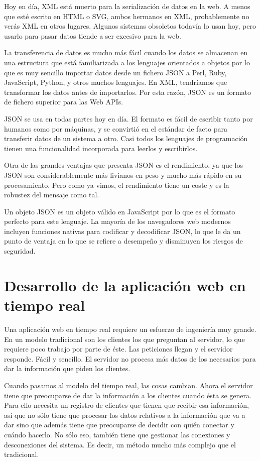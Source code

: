 Hoy en día, XML está muerto para la serialización de datos en la web. A menos que esté escrito en HTML o SVG, ambos hermanos en XML, probablemente no verás XML en otros lugares. Algunos sistemas obsoletos todavía lo usan hoy, pero usarlo para pasar datos tiende a ser excesivo para la web.

La transferencia de datos es mucho más fácil cuando los datos se almacenan en una estructura que está familiarizada a los lenguajes orientados a objetos por lo que es muy sencillo importar datos desde un fichero JSON a Perl, Ruby, JavaScript, Python, y otros muchos lenguajes. En XML, tendríamos que transformar los datos antes de importarlos. Por esta razón, JSON es un formato de fichero superior para las Web APIs.

JSON se usa en todas partes hoy en día. El formato es fácil de escribir tanto por humanos como por máquinas, y se convirtió en el estándar de facto para transferir datos de un sistema a otro. Casi todos los lenguajes de programación tienen una funcionalidad incorporada para leerlos y escribirlos.

Otra de las grandes ventajas que presenta JSON es el rendimiento, ya que los JSON son considerablemente más livianos en peso y mucho más rápido en su procesamiento. Pero como ya vimos, el rendimiento tiene un coste y es la robustez del mensaje como tal.

Un objeto JSON es un objeto válido en JavaScript por lo que es el formato perfecto para este lenguaje. La mayoría de los navegadores web modernos incluyen funciones nativas para codificar y decodificar JSON, lo que le da un punto de ventaja en lo que se refiere a desempeño y disminuyen los riesgos de seguridad.

\section{Desarrollo de la aplicación web en tiempo real}

Una aplicación web en tiempo real requiere un esfuerzo de ingeniería muy grande. En un modelo tradicional son los clientes los que preguntan al servidor, lo que requiere poco trabajo por parte de éste. Las peticiones llegan y el servidor responde. Fácil y sencillo. El servidor no procesa más datos de los necesarios para dar la información que piden los clientes.

Cuando pasamos al modelo del tiempo real, las cosas cambian. Ahora el servidor tiene que preocuparse de dar la información a los clientes cuando ésta se genera. Para ello necesita un registro de clientes que tienen que recibir esa información, así que no sólo tiene que procesar los datos relativos a la información que va a dar sino que además tiene que preocuparse de decidir con quién conectar y cuándo hacerlo. No sólo eso, también tiene que gestionar las conexiones y desconexiones del sistema. Es decir, un método mucho más complejo que el tradicional.

